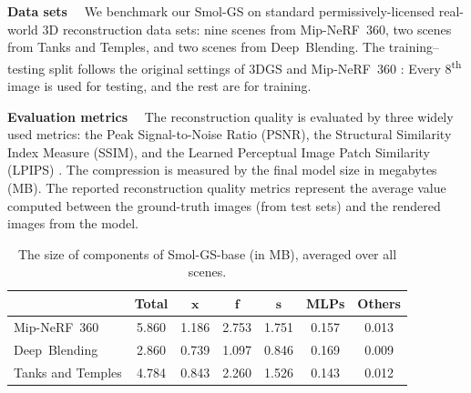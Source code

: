 \documentclass{article}
\def\vf{{\bm{f}}}
\def\vs{{\bm{s}}}
\def\vx{{\bm{x}}}
\newcommand{\ours}{Smol-GS\xspace}
\newcommand{\mipnerf}{{\sc Mip-NeRF~360}\xspace}
\newcommand{\tandt}{{\sc Tanks and Temples}\xspace}
\newcommand{\deepblending}{{\sc Deep~Blending}\xspace}
\renewcommand{\paragraph}[1]{\noindent\textbf{#1}~~}
\begin{document}
%

\paragraph{Data sets} We benchmark our \ours on standard permissively-licensed real-world 3D reconstruction data sets: nine scenes from \mipnerf \cite{ds_MipNeRF360}, two scenes from \tandt \cite{ds_tanks_and_temples}, and two scenes from \deepblending \cite{ds_deep_blending}. 
%
The training--testing split follows the original settings of 3DGS \cite{kerbl20233dgs} and Mip-NeRF~360 \citep{ds_MipNeRF360}: Every 8\textsuperscript{th} image is used for testing, and the rest are for training.

\paragraph{Evaluation metrics}
The reconstruction quality is evaluated by three widely used metrics: the Peak Signal-to-Noise Ratio (PSNR), the Structural Similarity Index Measure (SSIM), and the Learned Perceptual Image Patch Similarity (LPIPS) \cite{Zhang_2018_CVPR_lpips}. The compression is measured by the final model size in megabytes (MB). The reported reconstruction quality metrics represent the average value computed between the ground-truth images (from test sets) and the rendered images from the model.

\begin{table}
  \vspace*{-1em}
  \centering\scriptsize
  \caption{The size of components of \ours-base (in MB), averaged over all scenes.
  }
  \label{table:size_of_components}
  \setlength{\tabcolsep}{3.3pt}
\begin{tabular}{lc|ccccc}
\toprule
 & Total & ${\vx}$ & ${\vf}$ & ${\vs}$ & MLPs & Others \\
\midrule
\mipnerf & 5.860 & 1.186 & 2.753 & 1.751 & 0.157 & 0.013 \\
\deepblending & 2.860 & 0.739 & 1.097 & 0.846 & 0.169 & 0.009 \\
\tandt & 4.784 & 0.843 & 2.260 & 1.526 & 0.143 & 0.012 \\
\bottomrule
\end{tabular}
   \vspace*{-1em}
%
\end{table}
\end{document}
